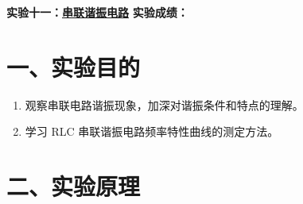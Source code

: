 \documentclass[12pt,a4paper]{article}
\begin{document}
\noindent
{\Large \textbf{实验十一：}\underline{\textbf{串联谐振电路}}} \hfill {\Large \textbf{实验成绩：}\underline{\hspace{3cm}}}
\vspace{0.5cm}

\section*{一、实验目的}
\begin{enumerate}
    \item 观察串联电路谐振现象，加深对谐振条件和特点的理解。
    \item 学习 RLC 串联谐振电路频率特性曲线的测定方法。
\end{enumerate}

\section*{二、实验原理}
\end{document}
